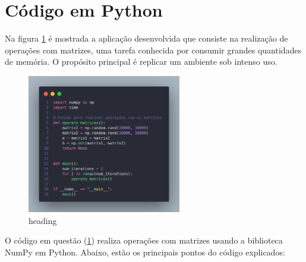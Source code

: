 \documentclass[
	12pt,				%
	openright,			%
	oneside,			%
	a4paper,			%
	chapter=TITLE,		%
	english,			%
	french,				%
	spanish,			%
	brazil				%
	]{abntex2}
\theoremstyle{definition}
\begin{document}
\section{Código em Python}

Na figura \ref{fig:swapy} é mostrada a aplicação desenvolvida que consiste na realização de operações 
com matrizes, uma tarefa conhecida por consumir grandes quantidades de memória. O propósito principal 
é replicar um ambiente sob intenso uso.

\begin{figure}[H]
	\centering
	\includegraphics[width=0.6\textwidth]{swapy.png}
	\caption{heading}
	\label{fig:swapy}
\end{figure}


O código em questão (\ref{fig:swapy}) realiza operações com matrizes usando a biblioteca NumPy em Python. 
Abaixo, estão os principais pontos do código explicados:
\end{document}
